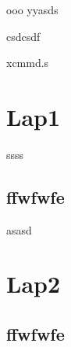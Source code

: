 \documentclass[10pt]{scrbook}
\begin{document}
%

\newpage\thispagestyle{empty}
%
\MyBookSide{\MyChapterContents}ooo
yyasds

csdcsdf


xcmmd.s

\chapter{Lap1}
ssss

\section{ffwfwfe}
asasd

\chapter{Lap2}
\section{ffwfwfe}

%

%
%

% 
% 
% 
% 
% 

%


%
\end{document}
